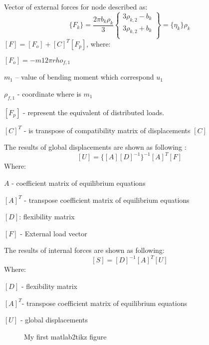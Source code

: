 Vector of external forces for node described as:
\begin{equation}\label{eqn:ExtrLoad}
    \{F_k\}=
    \frac{2\pi b_k\rho_k}{3}
    \left\{\begin{matrix}
        3\rho_{k,2}-b_k \\[2ex]
        3\rho_{k,2}+b_k \\[2ex]
    \end{matrix}\right\}
    =
    \{\eta_k\}\rho_k
\end{equation}
$[F]=[F_o]+[C]^T[F_p]$, where:\par
$[F_o]=-m1 2\pi rho_{f,1}$\par
$m_1$ – value of bending moment which correspond $u_1$\par
$\rho_{f,1}$ - coordinate where is $m_1$\par
$[F_p]$ - represent the equivalent of distributed loads.\par
$[C]^T$ - is transpose of compatibility matrix of displacements $[C]$\par

The results of global displacements are shown as following : 
\begin{equation}\label{eqn:Uglob}
    [U]=\{[A][D]^{-1}\}^{-1}[A]^T[F]
\end{equation}
Where:\par
$A$ - coefficient matrix of equilibrium equations\par
$[A]^T$ - transpose coefficient matrix of equilibrium equations\par
$[D]$: flexibility matrix\par
$[F]$ - External load vector\par
{}
\par
The results of internal forces are shown as following: 
\begin{equation}\label{eqn:Ulocal}
    [S]=[D]^{-1}[A]^T[U]
\end{equation}
Where:\par
$[D]$ - flexibility matrix \par
$[A]^T$- transpose coefficient matrix of equilibrium equations\par
$[U]$ - global displacements\par
{}
\begin{figure}
    \centering
    
    \caption{ My first matlab2tikz figure }
    \label{fig:myfirstfig}
\end{figure}